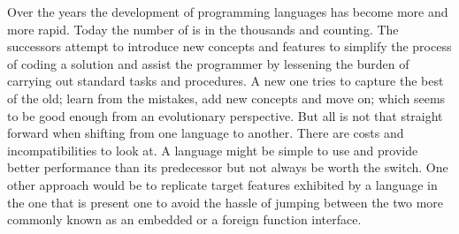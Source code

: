 \documentclass[thesis-solanki.tex]{subfiles}
\begin{document}
Over the years the development of programming languages has become more and more rapid.
Today the number of is in the thousands and counting.
The successors attempt to introduce new concepts and features to simplify the process of coding a solution and assist
the programmer by lessening the burden of carrying out standard tasks and procedures.
A new one tries to capture the best of the old; learn from the mistakes, add new concepts and move on; which seems to be
good enough from an evolutionary perspective.
But all is not that straight forward when shifting from one language to another.
There are costs and incompatibilities to look at.
A language might be simple to use and provide better performance than its predecessor but not always be worth the
switch.
One other approach would be to replicate target features exhibited by a language in the one that is present one to avoid the hassle of 
jumping between the two more commonly known as an embedded or a foreign function interface.

\begin{comment}
\par \progLang{Prolog} has a similar story. It was born in an era where procedural programming had made everyone notice their presence. Talking about 
competition, it was against something radical; the \progLang{C} programming language. The languages \progLang{C} has influenced is off the chart and 
so is the performance. It had paved the way for structured procedural programming and had given birth to the Unix operating system. Though the 
original version of \progLang{Prolog} has given rise to a large number of different flavours but a few drawbacks remain through the bloodline and as a 
result it did become the first choice. Some basic requirements such as modules are not provided by all compilers. To make it do real world stuff, a set of 
practical features are pushed in now and then which results in the loss of the purely declarative charm. The problem is that \progLang{Prolog} is fading 
away, \cite{website:prolog-steam,website:prolog-death,website:prolog-killer}, not many people use it and most of the times when it is used, the variant 
is usually \textit{practical} \progLang{Prolog} and the area being academia. It is not used for building large programs \cite{wikiprolog,somogyi1995
logic,website:prolog1000db}. But there are a lot of good things about \progLang{Prolog} that should not die away. Moreover, \progLang{Prolog} is ideal 
for search problems. 
\end{comment}
\end{document}

